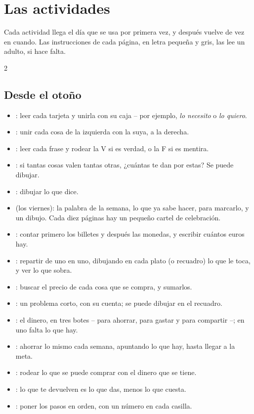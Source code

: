 \section*{Las actividades}

Cada actividad llega el día que se usa por primera vez, y después vuelve
de vez en cuando. Las instrucciones de cada página, en letra pequeña y
gris, las lee un adulto, si hace falta.

{\small
\begin{multicols}{2}
\raggedright
\subsection*{Desde el otoño}
\begin{itemize}[leftmargin=5mm, itemsep=1pt, topsep=0pt]
\item \textbf{\lblClasifica}: leer cada tarjeta y unirla con su caja
  -- por ejemplo, \emph{lo necesito} o \emph{lo quiero}.
\item \textbf{\lblUne}: unir cada cosa de la izquierda con la suya, a
  la derecha.
\item \textbf{\lblVF}: leer cada frase y rodear la V si es verdad, o la
  F si es mentira.
\item \textbf{\lblTrueque}: si tantas cosas valen tantas otras, ¿cuántas
  te dan por estas? Se puede dibujar.
\item \textbf{\lblDibuja}: dibujar lo que dice.
\item \textbf{\lblRepasa} (los viernes): la palabra de la semana, lo que
  ya sabe hacer, para marcarlo, y un dibujo. Cada diez páginas hay un
  pequeño cartel de celebración.
\item \textbf{\lblDinero}: contar primero los billetes y después las
  monedas, y escribir cuántos euros hay.
\item \textbf{\lblReparte}: repartir de uno en uno, dibujando en cada
  plato (o recuadro) lo que le toca, y ver lo que sobra.
\item \textbf{\lblCompra}: buscar el precio de cada cosa que se
  compra, y sumarlos.
\item \textbf{\lblProblema}: un problema corto, con su cuenta; se puede
  dibujar en el recuadro.
\item \textbf{\lblBotes}: el dinero, en tres botes -- para ahorrar,
  para gastar y para compartir --; en uno falta lo que hay.
\item \textbf{\lblHucha}: ahorrar lo mismo cada semana, apuntando lo
  que hay, hasta llegar a la meta.
\item \textbf{\lblLlega}: rodear lo que se puede comprar con el dinero
  que se tiene.
\item \textbf{\lblVuelta}: lo que te devuelven es lo que das, menos lo
  que cuesta.
\item \textbf{\lblOrdena}: poner los pasos en orden, con un número en
  cada casilla.
\end{itemize}
\end{multicols}}
\newpage

